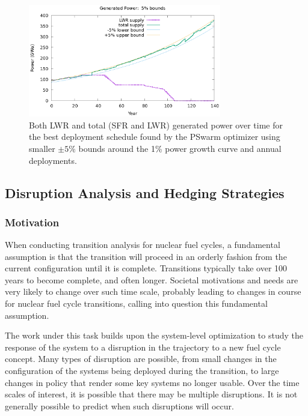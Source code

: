 \begin{figure}
    \centering
    \includegraphics[width=0.75\textwidth]{best-known-power.eps}
    \caption[Power for best build schedule with $\pm5\%$ bounds]{ Both
      \gls{LWR} and total (\gls{SFR} and \gls{LWR}) generated power over time
      for the best deployment schedule found by the PSwarm optimizer using
      smaller $\pm5\%$ bounds around the 1\% power growth curve and annual
      deployments.  }

    \label{fig:exp1-bestknownpower}
\end{figure}

\subsection{Disruption Analysis and Hedging Strategies}
\subsubsection{Motivation}

When conducting transition analysis for nuclear fuel cycles, a fundamental
assumption is that the transition will proceed in an orderly fashion from the
current configuration until it is complete.  Transitions typically take over
100 years to become complete, and often longer.  Societal motivations and
needs are very likely to change over such time scale, probably leading to
changes in course for nuclear fuel cycle transitions, calling into question
this fundamental assumption.

The work under this task builds upon the system-level optimization to study
the response of the system to a disruption in the trajectory to a new fuel
cycle concept.  Many types of disruption are possible, from small changes in
the configuration of the systems being deployed during the transition, to
large changes in policy that render some key systems no longer usable.  Over
the time scales of interest, it is possible that there may be multiple
disruptions.  It is not generally possible to predict when such disruptions
will occur.

